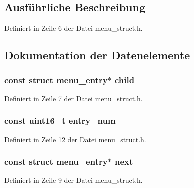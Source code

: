 \subsection{Ausführliche Beschreibung}


Definiert in Zeile 6 der Datei menu\+\_\+struct.\+h.



\subsection{Dokumentation der Datenelemente}
\hypertarget{structmenu__entry_afb8f7c977abd9b84c48a00c204aad77b}{}
\subsubsection[{child}]{\setlength{\rightskip}{0pt plus 5cm}const struct {\bf menu\+\_\+entry}$\ast$ child}\label{structmenu__entry_afb8f7c977abd9b84c48a00c204aad77b}


Definiert in Zeile 7 der Datei menu\+\_\+struct.\+h.

\hypertarget{structmenu__entry_aead51ebe631627145d52a84b2d92e240}{}
\subsubsection[{entry\+\_\+num}]{\setlength{\rightskip}{0pt plus 5cm}const uint16\+\_\+t entry\+\_\+num}\label{structmenu__entry_aead51ebe631627145d52a84b2d92e240}


Definiert in Zeile 12 der Datei menu\+\_\+struct.\+h.

\hypertarget{structmenu__entry_a8667330bb5cb56772e88abd901064211}{}
\subsubsection[{next}]{\setlength{\rightskip}{0pt plus 5cm}const struct {\bf menu\+\_\+entry}$\ast$ next}\label{structmenu__entry_a8667330bb5cb56772e88abd901064211}


Definiert in Zeile 9 der Datei menu\+\_\+struct.\+h.

\hypertarget{structmenu__entry_ac1b562fabcc9402003931e8351d6faf7}{}
